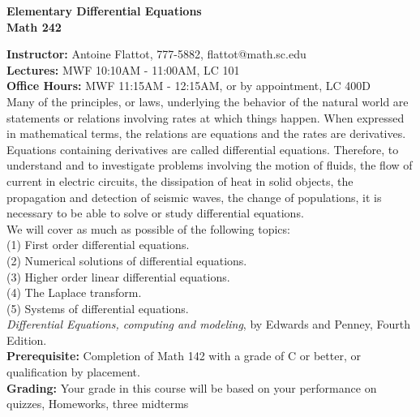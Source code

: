 \documentclass[12pt]{amsart}
\begin{document}
\thispagestyle{empty}
\begin{center}
\Large{\bf Elementary Differential Equations \\ Math 242}
\end{center}
\vspace*{0.8cm}
\large{{\bf Instructor:} Antoine Flattot, 777-5882, flattot@math.sc.edu}\\
\large{{\bf Lectures:} MWF 10:10AM - 11:00AM, LC 101}\\
\large{{\bf Office Hours:} MWF 11:15AM - 12:15AM, or by appointment, LC 400D}\\[0.8cm]
 Many of the principles, or laws, underlying the behavior of the natural world
are statements or relations involving rates at which things happen. When expressed in mathematical
terms, the relations are equations and the rates are derivatives. Equations containing derivatives are
called differential equations. Therefore, to understand and to investigate problems involving the 
motion of fluids, the flow of current in electric circuits, the dissipation of heat in solid objects,
the propagation and detection of seismic waves, the change of populations, it is necessary to 
be able to solve or study differential equations.\\[0.3cm] 
 We will cover as much as possible of the following topics:\\
\hspace*{0.3cm} (1) First order differential equations.\\
\hspace*{0.3cm} (2) Numerical solutions of differential equations.\\
\hspace*{0.3cm} (3) Higher order linear differential equations.\\
\hspace*{0.3cm} (4) The Laplace transform.\\
\hspace*{0.3cm} (5) Systems of differential equations.\\[0.3cm]
 {\em Differential Equations, computing and modeling}, by Edwards and Penney,
Fourth Edition.\\[0.3cm]
{\bf Prerequisite:} Completion of Math 142 with a grade of C or better, or qualification by placement.\\[0.3cm]
{\bf Grading:} Your grade in this course will be based on your performance on  quizzes, Homeworks, three midterms 
\end{document}
